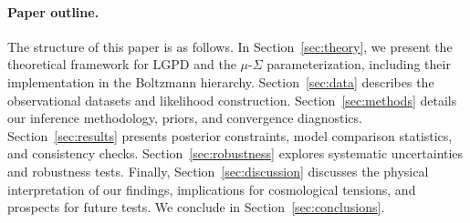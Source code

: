 \paragraph{Paper outline.}
The structure of this paper is as follows. In Section~\ref{sec:theory}, we present the theoretical framework for LGPD and the $\mu$-$\Sigma$ parameterization, including their implementation in the Boltzmann hierarchy. Section~\ref{sec:data} describes the observational datasets and likelihood construction. Section~\ref{sec:methods} details our inference methodology, priors, and convergence diagnostics. Section~\ref{sec:results} presents posterior constraints, model comparison statistics, and consistency checks. Section~\ref{sec:robustness} explores systematic uncertainties and robustness tests. Finally, Section~\ref{sec:discussion} discusses the physical interpretation of our findings, implications for cosmological tensions, and prospects for future tests. We conclude in Section~\ref{sec:conclusions}.
